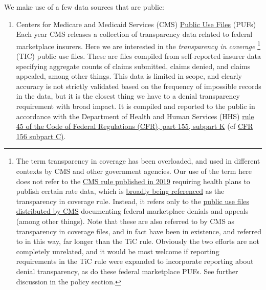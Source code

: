 \documentclass[psamsfonts]{amsart}
\theoremstyle{plain}
\theoremstyle{definition}
\theoremstyle{remark}
\begin{document}
We make use of a few data sources that are public:\\

\begin{enumerate}
	\item Centers for Medicare and Medicaid Services (CMS) \href{https://www.cms.gov/cciio/resources/data-resources/marketplace-puf}{Public Use Files} (PUFs)\\
	
	Each year CMS releases a collection of transparency data related to federal marketplace insurers. Here we are interested in the \emph{transparency in coverage} \footnote{The term transparency in coverage has been overloaded, and used in different contexts by CMS and other government agencies. Our use of the term here does not refer to the \href{https://www.federalregister.gov/documents/2019/11/27/2019-25011/transparency-in-coverage}{CMS rule published in 2019} requiring health plans to publish certain rate data, which is \href{https://www.cms.gov/healthplan-price-transparency}{broadly being referenced} as the transparency in coverage rule. Instead, it refers only to the \href{https://www.cms.gov/cciio/resources/data-resources/marketplace-puf}{public use files distributed by CMS} documenting federal marketplace denials and appeals (among other things). Note that these are also referred to by CMS as transparency in coverage files, and in fact have been in existence, and referred to in this way, far longer than the TiC rule. Obviously the two efforts are not completely unrelated, and it would be most welcome if reporting requirements in the TiC rule were expanded to incorporate reporting about denial transparency, as do these federal marketplace PUFs. See further discussion in the policy section.} (TIC) public use files. These are files compiled from self-reported insurer data specifying aggregate counts of claims submitted, claims denied, and claims appealed, among other things. This data is limited in scope, and clearly accuracy is not strictly validated based on the frequency of impossible records in the data, but it is the closest thing we have to a denial transparency requirement with broad impact. It is compiled and reported to the public in accordance with the Department of Health and Human Services (HHS) \href{https://www.ecfr.gov/current/title-45/subtitle-A/subchapter-B/part-155/subpart-K/section-155.1040}{rule 45 of the Code of Federal Regulations (CFR), part 155, subpart K} (cf \href{https://www.ecfr.gov/current/title-45/subtitle-A/subchapter-B/part-156/subpart-C/section-156.220}{CFR 156 subpart C)}.\\
	

\end{enumerate}
\end{document}
